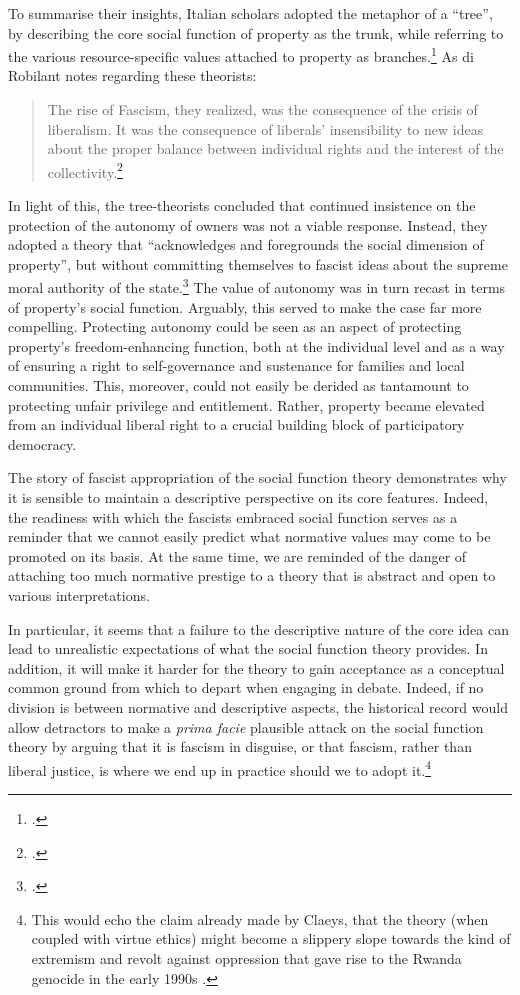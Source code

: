To summarise their insights, Italian scholars adopted the metaphor of a ``tree'', by describing the core social function of property as the trunk, while referring to the various resource-specific values attached to property as branches.\footcite[894-916]{robilant13} As di Robilant notes regarding these theorists:

\begin{quote}
The rise of Fascism, they realized, was the
consequence of the crisis of liberalism. It was the consequence of liberals' insensibility to new ideas about the proper balance between individual rights and the interest of the collectivity.\footcite[907]{robilant13}
\end{quote}

In light of this, the tree-theorists concluded that continued insistence on the protection of the autonomy of owners was not a viable response. Instead, they adopted a theory that ``acknowledges and foregrounds the social dimension of property'', but without committing themselves to fascist ideas about the supreme moral authority of the state.\footcite[907]{robilant13} The value of autonomy was in turn recast in terms of property's social function. Arguably, this served to make the case far more compelling. Protecting autonomy could be seen as an aspect of protecting property's freedom-enhancing function, both at the individual level and as a way of ensuring a right to self-governance and sustenance for families and local communities. This, moreover, could not easily be derided as tantamount to protecting unfair privilege and entitlement. Rather, property became elevated from an individual liberal right to a crucial building block of participatory democracy.

The story of fascist appropriation of the social function theory demonstrates why it is sensible to maintain a descriptive perspective on its core features. Indeed, the readiness with which the fascists embraced social function  serves as a reminder that we cannot easily predict what normative values may come to be promoted on its basis. At the same time, we are reminded of the danger of attaching too much normative prestige to a theory that is abstract and open to various interpretations.

In particular, it seems that a failure to  the descriptive nature of the core idea can lead to unrealistic expectations of what the social function theory provides. In addition, it will make it harder for the theory to gain acceptance as a conceptual common ground from which to depart when engaging in debate. Indeed, if no division is  between normative and descriptive aspects, the historical record would allow detractors to make a {\it prima facie} plausible attack on the social function theory by arguing that it is fascism in disguise, or that fascism, rather than liberal justice, is where we end up in practice should we  to adopt it.\footnote{This would echo the claim already made by Claeys, that the theory (when coupled with virtue ethics) might become a slippery slope towards the kind of extremism and revolt against oppression that gave rise to the Rwanda genocide in the early 1990s \cite[926-927]{claeys09}.}

